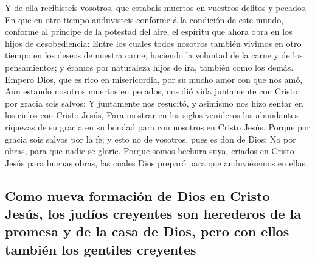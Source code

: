  Y de ella recibisteis vosotros, que estabais muertos en
vuestros delitos y pecados,  En que en otro tiempo
anduvisteis conforme á la condición de este mundo, conforme al príncipe
de la potestad del aire, el espíritu que ahora obra en los hijos de
desobediencia:  Entre los cuales todos nosotros también
vivimos en otro tiempo en los deseos de nuestra carne, haciendo la
voluntad de la carne y de los pensamientos; y éramos por naturaleza
hijos de ira, también como los demás.  Empero Dios, que es
rico en misericordia, por su mucho amor con que nos amó, 
Aun estando nosotros muertos en pecados, nos dió vida juntamente con
Cristo; por gracia sois salvos;  Y juntamente nos resucitó,
y asimismo nos hizo sentar en los cielos con Cristo Jesús, 
Para mostrar en los siglos venideros las abundantes riquezas de su
gracia en su bondad para con nosotros en Cristo Jesús. 
Porque por gracia sois salvos por la fe; y esto no de vosotros, pues es
don de Dios:  No por obras, para que nadie se gloríe.
 Porque somos hechura suya, criados en Cristo Jesús para
buenas obras, las cuales Dios preparó para que anduviésemos en ellas.

\hypertarget{como-nueva-formaciuxf3n-de-dios-en-cristo-jesuxfas-los-juduxedos-creyentes-son-herederos-de-la-promesa-y-de-la-casa-de-dios-pero-con-ellos-tambiuxe9n-los-gentiles-creyentes}{%
\subsection{Como nueva formación de Dios en Cristo Jesús, los judíos
creyentes son herederos de la promesa y de la casa de Dios, pero con
ellos también los gentiles
creyentes}\label{como-nueva-formaciuxf3n-de-dios-en-cristo-jesuxfas-los-juduxedos-creyentes-son-herederos-de-la-promesa-y-de-la-casa-de-dios-pero-con-ellos-tambiuxe9n-los-gentiles-creyentes}}

